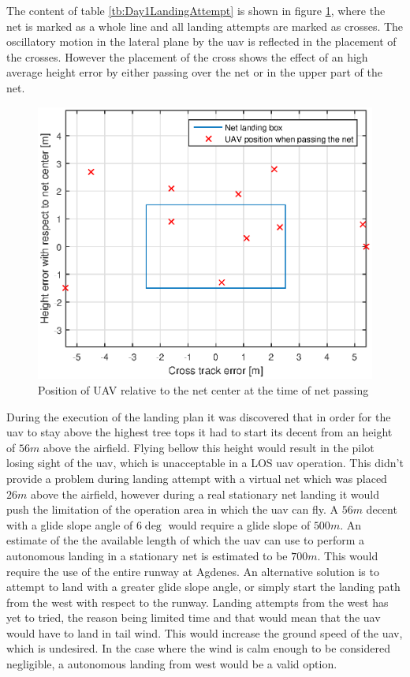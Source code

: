 The content of table \ref{tb:Day1LandingAttempt} is shown in figure \ref{Fig:Day1NetPass}, where the net is marked as a whole line and all landing attempts are marked as crosses. The oscillatory motion in the lateral plane by the \gls{uav} is reflected in the placement of the crosses. However the placement of the cross shows the effect of an high average height error by either passing over the net or in the upper part of the net.
\begin{figure}[H]
\centering
\includegraphics[scale=0.7]{figs/Experiment/day1NetHit.eps}
\caption{Position of UAV relative to the net center at the time of net passing}
\label{Fig:Day1NetPass}
\end{figure}
During the execution of the landing plan it was discovered that in order for the \gls{uav} to stay above the highest tree tops it had to start its decent from an height of $56 m$ above the airfield. Flying bellow this height would result in the pilot losing sight of the \gls{uav}, which is unacceptable in a LOS \gls{uav} operation. This didn't provide a problem during landing attempt with a virtual net which was placed $26 m$ above the airfield, however during a real stationary net landing it would push the limitation of the operation area in which the \gls{uav} can fly. A $56 m $ decent with a glide slope angle of $6\deg$ would require a glide slope of $500 m$. An estimate of the the available length of which the \gls{uav} can use to perform a autonomous landing in a stationary net is estimated to be $700 m$. This would require the use of the entire runway at Agdenes. An alternative solution is to attempt to land with a greater glide slope angle, or simply start the landing path from the west with respect to the runway. Landing attempts from the west has yet to tried, the reason being limited time and that would mean that the \gls{uav} would have to land in tail wind. This would increase the ground speed of the \gls{uav}, which is undesired. In the case where the wind is calm enough to be considered negligible, a autonomous landing from west would be a valid option.
